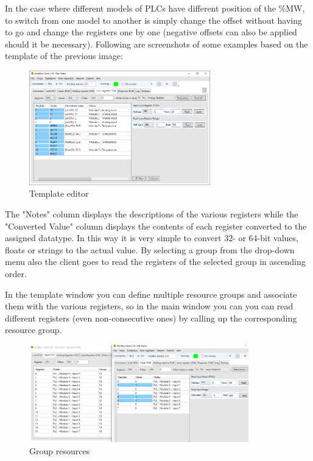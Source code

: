 In the case where different models of PLCs have different position
of the \%MW, to switch from one model to another is
simply change the offset without having to go and change the registers 
one by one
(negative offsets can also be applied
should it be necessary).
Following are screenshots of some examples based on the template
of the previous image:

\begin{figure}[H]
\centering
\includegraphics[width=0.70\textwidth]{../Img/ModBus_Client_Template_ReadDemo00.PNG}
\caption{Template editor}
\end{figure}

The "Notes" column displays the descriptions of the various registers 
while the "Converted Value" column displays the contents
of each register converted to the assigned datatype. In this way it is very simple to 
convert 32- or 64-bit values, floats or strings to the actual value.
By selecting a group from the drop-down menu also the client goes to read the registers
of the selected group in ascending order.

In the template window you can define multiple resource groups and
associate them with the various registers, so in the main window you can 
you can read different registers (even non-consecutive ones)
by calling up the corresponding resource group.

\begin{figure}[H]
\centering
\includegraphics[width=0.85\textwidth]{../Img/ModBus_Client_Template_Group00.PNG}
\caption{Group resources}
\end{figure}

